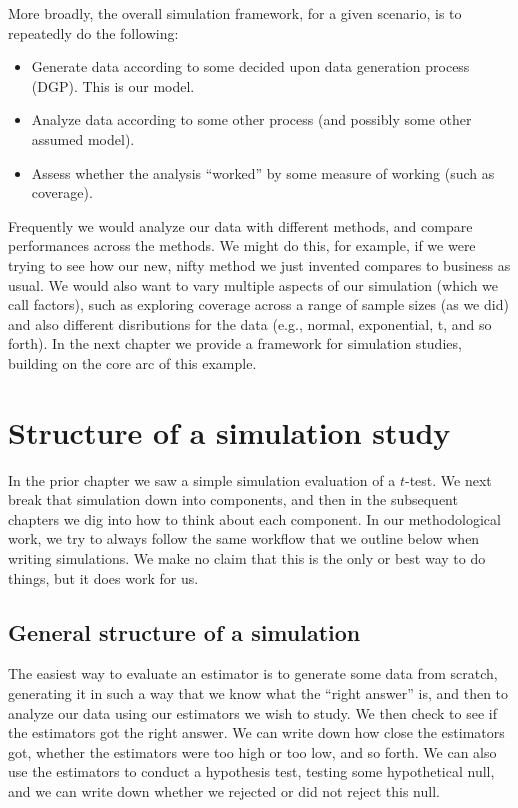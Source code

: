 \documentclass[
]{book}
\providecommand{\tightlist}{%
  \setlength{\itemsep}{0pt}\setlength{\parskip}{0pt}}
\begin{document}
More broadly, the overall simulation framework, for a given scenario, is to repeatedly do the following:

\begin{itemize}
\tightlist
\item
  Generate data according to some decided upon data generation process (DGP).
  This is our model.
\item
  Analyze data according to some other process (and possibly some other assumed model).
\item
  Assess whether the analysis ``worked'' by some measure of working (such as coverage).
\end{itemize}

Frequently we would analyze our data with different methods, and compare performances across the methods.
We might do this, for example, if we were trying to see how our new, nifty method we just invented compares to business as usual.
We would also want to vary multiple aspects of our simulation (which we call factors), such as exploring coverage across a range of sample sizes (as we did) and also different disributions for the data (e.g., normal, exponential, t, and so forth).
In the next chapter we provide a framework for simulation studies, building on the core arc of this example.

\hypertarget{structure-of-a-simulation-study}{%
\chapter{Structure of a simulation study}\label{structure-of-a-simulation-study}}

In the prior chapter we saw a simple simulation evaluation of a \(t\)-test.
We next break that simulation down into components, and then in the subsequent chapters we dig into how to think about each component.
In our methodological work, we try to always follow the same workflow that we outline below when writing simulations.
We make no claim that this is the only or best way to do things, but it does work for us.

\hypertarget{general-structure-of-a-simulation}{%
\section{General structure of a simulation}\label{general-structure-of-a-simulation}}

The easiest way to evaluate an estimator is to generate some data from scratch, generating it in such a way that we know what the ``right answer'' is, and then to analyze our data using our estimators we wish to study.
We then check to see if the estimators got the right answer. We can write down how close the estimators got, whether the estimators were too high or too low, and so forth.
We can also use the estimators to conduct a hypothesis test, testing some hypothetical null, and we can write down whether we rejected or did not reject this null.
\end{document}
